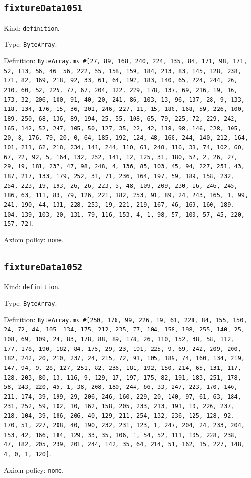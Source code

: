 \documentclass[11pt]{article}
\begin{document}
\subsection*{\texttt{fixtureData1051}}
\noindent Kind: \texttt{definition}.\par
\noindent Type: \texttt{ByteArray}.\par
\noindent Definition: \texttt{ByteArray.mk \#[27, 89, 168, 240, 224, 135, 84, 171, 98, 171, 52, 113, 56, 46, 56, 222, 55, 158, 159, 184, 213, 83, 145, 128, 238, 171, 82, 169, 218, 92, 33, 61, 64, 192, 183, 140, 65, 224, 244, 26, 210, 60, 52, 225, 77, 67, 204, 122, 229, 178, 137, 69, 216, 19, 16, 173, 32, 206, 100, 91, 40, 20, 241, 86, 103, 13, 96, 137, 28, 9, 133, 118, 134, 176, 15, 36, 202, 246, 227, 11, 15, 180, 168, 59, 226, 100, 189, 250, 68, 136, 89, 194, 25, 55, 108, 65, 79, 225, 72, 229, 242, 165, 142, 52, 247, 105, 50, 127, 35, 22, 42, 118, 98, 146, 228, 105, 20, 8, 176, 79, 20, 0, 64, 185, 192, 124, 48, 160, 244, 140, 212, 164, 101, 211, 62, 218, 234, 141, 244, 110, 61, 248, 116, 38, 74, 102, 60, 67, 22, 92, 5, 164, 132, 252, 141, 12, 125, 31, 180, 52, 2, 26, 27, 29, 19, 181, 237, 47, 98, 248, 4, 136, 85, 103, 45, 94, 227, 251, 43, 187, 217, 133, 179, 252, 31, 71, 236, 164, 197, 59, 189, 158, 232, 254, 223, 19, 193, 26, 26, 223, 5, 48, 109, 209, 230, 16, 246, 245, 186, 63, 111, 83, 79, 126, 221, 182, 253, 91, 89, 24, 243, 165, 1, 99, 241, 190, 44, 131, 228, 253, 19, 221, 219, 167, 46, 169, 160, 189, 104, 139, 103, 20, 131, 79, 116, 153, 4, 1, 98, 57, 100, 57, 45, 220, 157, 72]}.\par
\noindent Axiom policy: \texttt{none}.\par
\subsection*{\texttt{fixtureData1052}}
\noindent Kind: \texttt{definition}.\par
\noindent Type: \texttt{ByteArray}.\par
\noindent Definition: \texttt{ByteArray.mk \#[250, 176, 99, 226, 19, 61, 228, 84, 155, 150, 24, 72, 44, 105, 134, 175, 212, 235, 77, 104, 158, 198, 255, 140, 25, 108, 69, 109, 24, 83, 178, 88, 89, 178, 26, 110, 152, 38, 58, 112, 177, 178, 190, 182, 84, 175, 29, 23, 191, 225, 9, 69, 242, 209, 200, 182, 242, 20, 210, 237, 24, 215, 72, 91, 105, 189, 74, 160, 134, 219, 147, 94, 9, 28, 127, 251, 82, 236, 181, 192, 150, 214, 65, 131, 117, 128, 203, 80, 13, 116, 9, 129, 17, 197, 175, 82, 191, 183, 251, 178, 58, 243, 220, 45, 1, 38, 208, 180, 244, 66, 33, 247, 223, 170, 146, 211, 174, 39, 199, 29, 206, 246, 160, 229, 20, 140, 97, 61, 63, 184, 231, 252, 59, 102, 10, 162, 158, 205, 233, 213, 191, 10, 226, 237, 218, 104, 39, 186, 206, 40, 129, 211, 254, 132, 236, 125, 128, 92, 170, 51, 227, 208, 40, 190, 232, 231, 123, 1, 247, 204, 24, 233, 204, 153, 42, 166, 184, 129, 33, 35, 106, 1, 54, 52, 111, 105, 228, 238, 47, 182, 205, 239, 201, 244, 142, 35, 64, 214, 51, 162, 15, 227, 148, 4, 0, 1, 120]}.\par
\noindent Axiom policy: \texttt{none}.\par
\end{document}
